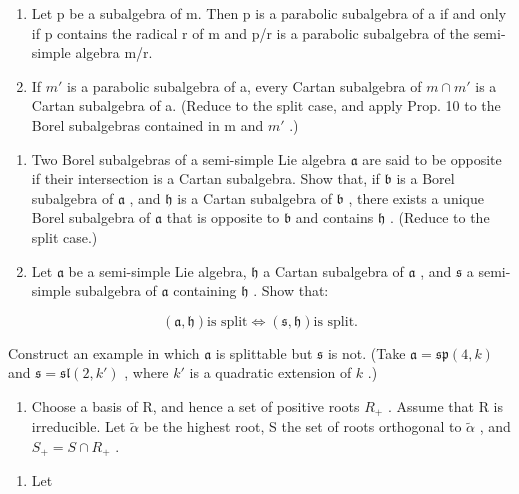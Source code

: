 \begin{enumerate}
\def\labelenumi{\alph{enumi})}
\item
  Let p be a subalgebra of m. Then p is a parabolic subalgebra of a if and only if p contains the radical r of m and p/r is a parabolic subalgebra of the semi-simple algebra m/r.
\item
  If \(m'\) is a parabolic subalgebra of a, every Cartan subalgebra of \(m \cap m'\) is a Cartan subalgebra of a. (Reduce to the split case, and apply Prop. 10 to the Borel subalgebras contained in m and \(m'\) .)
\end{enumerate}

\begin{enumerate}
\def\labelenumi{\arabic{enumi})}
\setcounter{enumi}{5}
\item
  Two Borel subalgebras of a semi-simple Lie algebra \(\mathfrak{a}\) are said to be opposite if their intersection is a Cartan subalgebra. Show that, if \(\mathfrak{b}\) is a Borel subalgebra of \(\mathfrak{a}\) , and \(\mathfrak{h}\) is a Cartan subalgebra of \(\mathfrak{b}\) , there exists a unique Borel subalgebra of \(\mathfrak{a}\) that is opposite to \(\mathfrak{b}\) and contains \(\mathfrak{h}\) . (Reduce to the split case.)
\item
  Let \(\mathfrak{a}\) be a semi-simple Lie algebra, \(\mathfrak{h}\) a Cartan subalgebra of \(\mathfrak{a}\) , and \(\mathfrak{s}\) a semi-simple subalgebra of \(\mathfrak{a}\) containing \(\mathfrak{h}\) . Show that:
\end{enumerate}

\[
(\mathfrak {a}, \mathfrak {h}) \text {is split} \Longleftrightarrow (\mathfrak {s}, \mathfrak {h}) \text {is split.}
\]

Construct an example in which \(\mathfrak{a}\) is splittable but \(\mathfrak{s}\) is not. (Take \(\mathfrak{a} = \mathfrak{sp}(4, k)\) and \(\mathfrak{s} = \mathfrak{sl}(2, k')\) , where \(k'\) is a quadratic extension of \(k\) .)

\begin{enumerate}
\def\labelenumi{\arabic{enumi})}
\setcounter{enumi}{7}
\tightlist
\item
  Choose a basis of R, and hence a set of positive roots \(R_{+}\) . Assume that R is irreducible. Let \(\tilde{\alpha}\) be the highest root, S the set of roots orthogonal to \(\tilde{\alpha}\) , and \(S_{+} = S \cap R_{+}\) .
\end{enumerate}

\begin{enumerate}
\def\labelenumi{\alph{enumi})}
\tightlist
\item
  Let
\end{enumerate}

